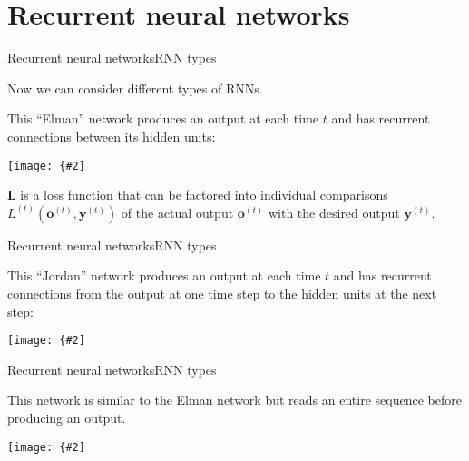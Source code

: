 \documentclass{beamer}
\renewcommand{\vec}[1]{\boldsymbol{#1}}
\newcommand{\myfig}[3]{\centerline{\texttt{[image: \{\#2]}}}
    \centerline{\scriptsize #3}}
\begin{document}
\section{Recurrent neural networks}

\begin{frame}{Recurrent neural networks}{RNN types}

  Now we can consider different types of RNNs.

  \medskip

  This ``Elman'' network produces an output at each time $t$ and has
  recurrent connections \alert{between its hidden units}:

  \medskip

  \myfig{2.2in}{goodfellow-fig10-03}{Goodfellow, Bengio, and Courville
    (2016), Fig.\ 10.3}

  \medskip

  $\vec{L}$ is a loss function that can be factored into individual
  comparisons $L^{(t)}(\vec{o}^{(t)},\vec{y}^{(t)})$ of the actual output
  $\vec{o}^{(t)}$ with the desired output $\vec{y}^{(t)}$.

\end{frame}


\begin{frame}{Recurrent neural networks}{RNN types}

  This ``Jordan'' network produces an output at each time $t$ and has
  recurrent connections \alert{from the output at one time step to the
    hidden units at the next step}:

  \medskip
  
  \myfig{3in}{goodfellow-fig10-04}{Goodfellow, Bengio, and Courville
    (2016), Fig.\ 10.4}
  
\end{frame}


\begin{frame}{Recurrent neural networks}{RNN types}

  This network is similar to the Elman network but \alert{reads an
    entire sequence} before producing an output.

  \medskip
  
  \myfig{2.5in}{goodfellow-fig10-05}{Goodfellow, Bengio, and Courville
    (2016), Fig.\ 10.5}
  
\end{frame}
\end{document}
